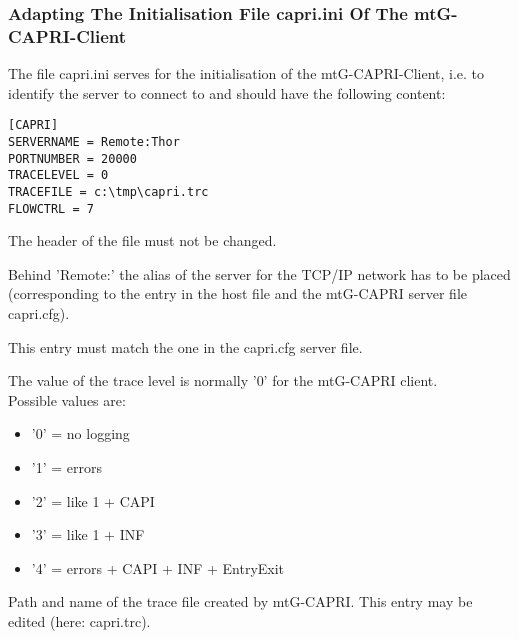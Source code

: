 \subsubsection{Adapting The Initialisation File capri.ini Of The mtG-CAPRI-Client}
    The file capri.ini serves for the initialisation of the mtG-CAPRI-Client, i.e. to identify the server
    to connect to and should have the following content:
\begin{verbatim}
[CAPRI]
SERVERNAME = Remote:Thor
PORTNUMBER = 20000
TRACELEVEL = 0
TRACEFILE = c:\tmp\capri.trc
FLOWCTRL = 7
\end{verbatim}

\begin{description}

    The header of the file must not be changed.


    Behind 'Remote:' the alias of the server for the TCP/IP network has to be placed
    (corresponding to the entry in the host file and the mtG-CAPRI server file capri.cfg).

    This entry must match the one in the capri.cfg server file.


    The value of the trace level is normally '0' for the mtG-CAPRI client.\\
    Possible values are:
    \begin{itemize}
            \item '0' = no logging
            \item '1' = errors
            \item '2' = like 1 + CAPI
            \item '3' = like 1 + INF
            \item '4' = errors + CAPI + INF + EntryExit
   \end{itemize}



    Path and name of the trace file created by mtG-CAPRI.
    This entry may be edited (here: capri.trc).


\end{description}
